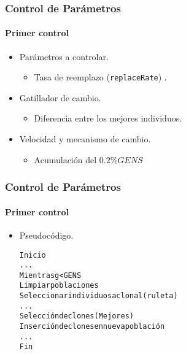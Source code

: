 \frame
{
\frametitle{Control de Parámetros}
\framesubtitle{Primer control}
\begin{itemize}
	\item Parámetros a controlar.
	\begin{itemize}
		\item Tasa de reemplazo (\texttt{replaceRate}) \blue{[0,1]}. 
	\end{itemize}
	\item Gatillador de cambio.
	\begin{itemize}
		\item Diferencia entre los mejores individuos.
	\end{itemize}
	\item Velocidad y mecanismo de cambio.
	\begin{itemize}
		\item Acumulación del $0.2\% GENS$
	\end{itemize}
\end{itemize}
}

\begin{frame}[t,fragile]
\frametitle{Control de Parámetros}
\framesubtitle{Primer control}
\begin{itemize}
	\item Pseudocódigo.
\tiny{
\begin{alltt}
    Inicio
    ...
    Mientras g < GENS
        Limpiar poblaciones
        Seleccionar individuos a clonal (ruleta)
        ...
        Selección de clones (Mejores)
        Inserción de clones en nueva población
        ...
    Fin
\end{alltt}
}
\end{itemize}
\end{frame}

